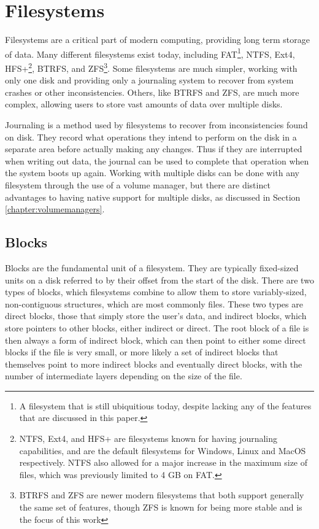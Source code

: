 \chapter{Filesystems}
Filesystems are a critical part of modern computing, providing long term storage of data.
Many different filesystems exist today, including FAT\footnote{A filesystem that is still ubiquitious today, 
despite lacking any of the features that are discussed in this paper.},
NTFS, Ext4, HFS+\footnote{NTFS, Ext4, and HFS+ are filesystems known for having journaling capabilities, 
and are the default filesystems for Windows, Linux and MacOS respectively.
NTFS also allowed for a major increase in the maximum size of files, which was previously limited to 4 GB on FAT.}, 
BTRFS, and ZFS\footnote{BTRFS and ZFS are newer modern filesystems that both support generally the same set of features,
though ZFS is known for being more stable and is the focus of this work}.
Some filesystems are much simpler, working with only one disk and providing only a journaling system to recover from system crashes
or other inconsistencies.
Others, like BTRFS and ZFS, are much more complex, allowing users to store vast amounts of data over multiple disks.

Journaling is a method used by filesystems to recover from inconsistencies found on disk.
They record what operations they intend to perform on the disk in a separate area before actually making any changes.
Thus if they are interrupted when writing out data, the journal can be used to complete that operation when the system boots up again.
Working with multiple disks can be done with any filesystem through the use of a volume manager,
but there are distinct advantages to having native support for multiple disks, as discussed in Section \ref{chapter:volumemanagers}.

\section{Blocks}
\label{chapter:blocks}
Blocks are the fundamental unit of a filesystem.
They are typically fixed-sized units on a disk referred to by their offset from the start of the disk.
There are two types of blocks, which filesystems combine to allow them to store variably-sized, non-contiguous structures,
which are most commonly files.
These two types are direct blocks, those that simply store the user's data, and indirect blocks, which store pointers to other blocks,
either indirect or direct.
The root block of a file is then always a form of indirect block, which can then point to either some direct blocks if the file is very small,
or more likely a set of indirect blocks that themselves point to more indirect blocks and eventually direct blocks,
with the number of intermediate layers depending on the size of the file.

